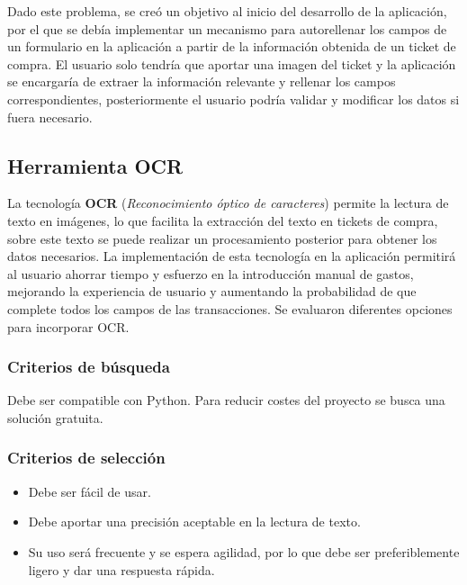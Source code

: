 Dado este problema, se creó un objetivo al inicio del desarrollo de la aplicación, por el que se debía implementar un mecanismo para autorellenar los campos de un formulario en la aplicación a partir de la información obtenida de un ticket de compra. El usuario solo tendría que aportar una imagen del ticket y la aplicación se encargaría de extraer la información relevante y rellenar los campos correspondientes, posteriormente el usuario podría validar y modificar los datos si fuera necesario.

\subsection{Herramienta OCR}
La tecnología \textbf{OCR} (\textit{Reconocimiento óptico de caracteres}) permite la lectura de texto en imágenes, lo que facilita la extracción del texto en tickets de compra, sobre este texto se puede realizar un procesamiento posterior para obtener los datos necesarios. La implementación de esta tecnología en la aplicación permitirá al usuario ahorrar tiempo y esfuerzo en la introducción manual de gastos, mejorando la experiencia de usuario y aumentando la probabilidad de que complete todos los campos de las transacciones. Se evaluaron diferentes opciones para incorporar OCR\cite{govindaraju2009guide}.

\subsubsection{Criterios de búsqueda}
Debe ser compatible con Python. Para reducir costes del proyecto se busca una solución gratuita. 

\subsubsection{Criterios de selección}
\begin{itemize}
    \item Debe ser fácil de usar.
    \item Debe aportar una precisión aceptable en la lectura de texto.
    \item Su uso será frecuente y se espera agilidad, por lo que debe ser preferiblemente ligero y dar una respuesta rápida.
\end{itemize}

